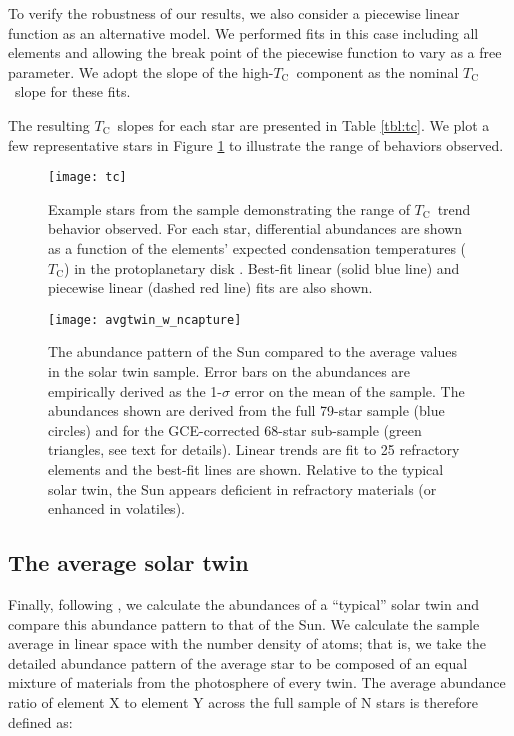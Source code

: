 \documentclass[twocolumn]{aastex62}
\newcommand{\tc}{$T_\mathrm{C}$}
\newcommand{\acronym}[1]{{\small{#1}}}
\begin{document}
To verify the robustness of our results, we also consider a piecewise linear function as an alternative model. We performed fits in this case including all elements and allowing the break point of the piecewise function to vary as a free parameter. We adopt the slope of the high-\tc\ component as the nominal \tc\ slope for these fits. 

The resulting \tc\ slopes for each star are presented in Table \ref{tbl:tc}. We plot a few representative stars in Figure \ref{fig:tc} to illustrate the range of behaviors observed.

\begin{figure}
\centering
\texttt{[image: tc]}
\caption{Example stars from the sample demonstrating the range of \tc\ trend behavior observed. For each star, differential abundances are shown as a function of the elements' expected condensation temperatures (\tc) in the protoplanetary disk \citep{lodders03}. Best-fit linear (solid blue line) and piecewise linear (dashed red line) fits are also shown.}
\label{fig:tc}
\end{figure}

\begin{figure*}
\centering
\texttt{[image: avgtwin\_w\_ncapture]}
\caption{The abundance pattern of the Sun compared to the average values in the solar twin sample. Error bars on the abundances are empirically derived as the 1-$\sigma$ error on the mean of the sample. The abundances shown are derived from the full 79-star sample (blue circles) and for the \acronym{GCE}-corrected 68-star sub-sample (green triangles, see text for details). Linear trends are fit to 25 refractory elements and the best-fit lines are shown. Relative to the typical solar twin, the Sun appears deficient in refractory materials (or enhanced in volatiles).}
\label{fig:avgtwin}
\end{figure*}

\subsection{The average solar twin}

Finally, following \citet{melendez09}, we calculate the abundances of a ``typical'' solar twin and compare this abundance pattern to that of the Sun. We calculate the sample average in linear space with the number density of atoms; that is, we take the detailed abundance pattern of the average star to be composed of an equal mixture of materials from the photosphere of every twin. The average abundance ratio of element X to element Y across the full sample of N stars is therefore defined as:
\end{document}
